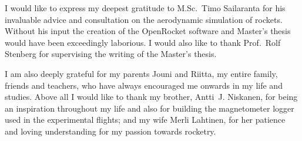\documentclass[a4paper,12pt,oneside]{book}
\begin{document}
I would like to express my deepest gratitude to M.Sc.~Timo Sailaranta
for his invaluable advice and consultation on the aerodynamic
simulation of rockets.  Without his input the creation of the
OpenRocket software and Master's thesis would have been exceedingly
laborious.  I would also like to thank Prof.~Rolf Stenberg for
supervising the writing of the Master's thesis.

I am also deeply grateful for my parents Jouni and Riitta, my entire
family, friends and teachers, who have always encouraged me onwards in
my life and studies.  Above all I would like to thank my brother,
Antti~J. Niskanen, for being an inspiration throughout my life and
also for building the magnetometer logger used in the experimental
flights; and my wife Merli Lahtinen, for her patience and loving
understanding for my passion towards rocketry.
\end{document}
